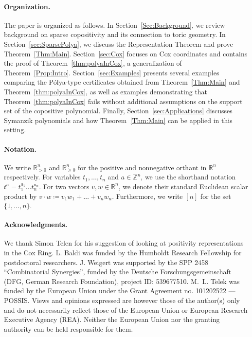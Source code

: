 \documentclass[a4paper,11pt]{amsart}
\theoremstyle{definition}
\newcommand{\RR}{\mathbb{R}}
\begin{document}
\paragraph{\textbf{Organization. }}The paper is organized as follows. In Section~\ref{Sec:Background}, we review background on sparse copositivity and its connection to toric geometry. In Section~\ref{sec:SparsePolya}, we discuss the Representation Theorem and prove Theorem~\ref{Thm:Main}. Section~\ref{sec:Cox} focuses on Cox coordinates and contains the proof of Theorem~\ref{thm:polyaInCox}, a generalization of Theorem~\ref{Prop:Intro}. Section~\ref{sec:Examples} presents several examples comparing the Pólya-type certificates obtained from Theorem~\ref{Thm:Main} and Theorem~\ref{thm:polyaInCox}, as well as examples demonstrating that Theorem~\ref{thm:polyaInCox} fails without additional assumptions on the support set of the copositive polynomial. Finally, Section~\ref{sec:Applications} discusses Symanzik polynomials and how Theorem~\ref{Thm:Main} can be applied in this setting.

\medskip

\paragraph{\textbf{Notation. }}
We write $\mathbb{R}_{>0}^n$ and $\mathbb{R}^n_{\geq0}$ for the positive and nonnegative orthant in $\mathbb{R}^n$ respectively. For variables $t_1, \dots , t_n$ and $a \in \mathbb{Z}^n$, we use the shorthand notation $t^a = t_1^{a_1}\dots t_n^{a_n}$.
For two vectors $v,w \in \RR^n$, we denote their standard Euclidean scalar product by $v \cdot w \coloneqq v_1 w_1 + \dots + v_n w_n$.
Furthermore, we write $[n]$ for the set $\{1,\dots,n\}$.

\medskip

\paragraph{\textbf{Acknowledgments. }} We thank Simon Telen for his suggestion of looking at positivity representations in the Cox Ring. L. Baldi was funded by the Humboldt Research Fellowship for postdoctoral researchers. J. Weigert was supported by the SPP 2458 “Combinatorial Synergies”, funded by the Deutsche Forschungsgemeinschaft (DFG, German Research Foundation),
project ID: 539677510. M.~L. Telek was funded by the European Union under the Grant Agreement no. 101202522 --- POSSIS. Views and opinions expressed are however those of the author(s) only and do not necessarily reflect those of the European Union or European Research Executive Agency (REA). Neither the European Union nor the granting authority can be held responsible for them.
\end{document}
